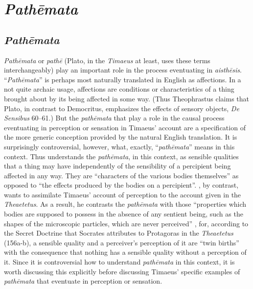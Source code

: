 
\chapter{\emph{Pathēmata}} %
\label{cha:pathemata}

\section{\emph{Pathēmata}} %
\label{sec:pathemata}

\emph{Pathēmata} or \emph{pathē} (Plato, in the \emph{Timaeus} at least, uses these terms interchangeably) play an important role in the process eventuating in \emph{aisthēsis}. ``\emph{Pathēmata}'' is perhaps most naturally translated in English as affections. In a not quite archaic usage, affections are conditions or characteristics of a thing brought about by its being affected in some way. (Thus Theophrastus claims that Plato, in contrast to Democritus, emphasizes the effects of sensory objects, \emph{De Sensibus} 60--61.) But the \emph{pathēmata} that play a role in the causal process eventuating in perception or sensation in Timaeus' account are a specification of the more generic conception provided by the natural English translation. It is surprisingly controversial, however, what, exactly, ``\emph{pathēmata}'' means in this context. Thus \citet[429-31]{Taylor:1928qb} understands the \emph{pathēmata}, in this context, as sensible qualities that a thing may have independently of the sensibility of a percipient being affected in any way. They are ``characters of the various bodies themselves'' as opposed to ``the effects produced by the bodies on a percipient''. \citet[258-9]{Cornford:1935fk}, by contrast, wants to assimilate Timaeus' account of perception to the account given in the \emph{Theaetetus}. As a result, he contrasts the \emph{pathēmata} with those ``properties which bodies are supposed to possess in the absence of any sentient being, such as the shapes of the microscopic particles, which are never perceived'' \citep[259]{Cornford:1935fk}, for, according to the Secret Doctrine that Socrates attributes to Protagoras in the \emph{Theaetetus} (156a-b), a sensible quality and a perceiver's perception of it are ``twin births'' with the consequence that nothing has a sensible quality without a perception of it. Since it is controversial how to understand \emph{pathēmata} in this context, it is worth discussing this explicitly before discussing Timaeus' specific examples of \emph{pathēmata} that eventuate in perception or sensation.

